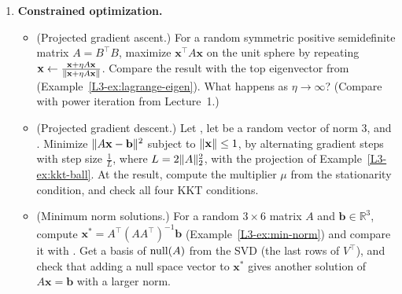 \begin{enumerate}[label=\textbf{P\arabic*.}, leftmargin=*]
    \item \textbf{Constrained optimization.}
    \begin{itemize}
        \item (Projected gradient ascent.) For a random symmetric positive semidefinite matrix $A = B^\top B$, maximize $\mathbf{x}^\top A\mathbf{x}$ on the unit sphere by repeating $\mathbf{x} \leftarrow \frac{\mathbf{x} + \eta A\mathbf{x}}{\lVert \mathbf{x} + \eta A\mathbf{x} \rVert}$. Compare the result with the top eigenvector from  (Example~\ref{L3-ex:lagrange-eigen}). What happens as $\eta \to \infty$? (Compare with power iteration from Lecture~1.)
        \item (Projected gradient descent.) Let , let  be a random vector of norm $3$, and . Minimize $\lVert A\mathbf{x} - \mathbf{b} \rVert^2$ subject to $\lVert \mathbf{x} \rVert \leq 1$, by alternating gradient steps with step size $\frac{1}{L}$, where $L = 2\lVert A \rVert_2^2$, with the projection of Example~\ref{L3-ex:kkt-ball}. At the result, compute the multiplier $\mu$ from the stationarity condition, and check all four KKT conditions.
        \item (Minimum norm solutions.) For a random $3 \times 6$ matrix $A$ and $\mathbf{b} \in \mathbb{R}^3$, compute $\mathbf{x}^* = A^\top(AA^\top)^{-1}\mathbf{b}$ (Example~\ref{L3-ex:min-norm}) and compare it with . Get a basis of $\operatorname{null}(A)$ from the SVD (the last rows of $V^\top$), and check that adding a null space vector to $\mathbf{x}^*$ gives another solution of $A\mathbf{x} = \mathbf{b}$ with a larger norm.
    \end{itemize}


\end{enumerate}
